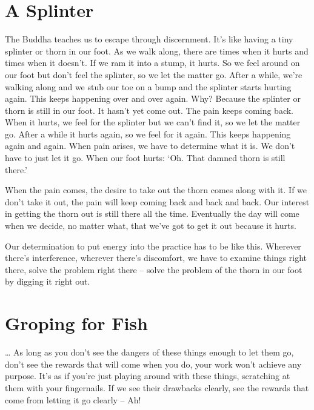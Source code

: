\clearpage

\section{A Splinter}

The Buddha teaches us to escape through discernment. It's like having a tiny splinter or thorn in our foot. As we walk along, there are times when it hurts and times when it doesn't. If we ram it into a stump, it hurts. So we feel around on our foot but don't feel the splinter, so we let the matter go. After a while, we're walking along and we stub our toe on a bump and the splinter starts hurting again. This keeps happening over and over again. Why? Because the splinter or thorn is still in our foot. It hasn't yet come out. The pain keeps coming back. When it hurts, we feel for the splinter but we can't find it, so we let the matter go. After a while it hurts again, so we feel for it again. This keeps happening again and again. When pain arises, we have to determine what it is. We don't have to just let it go. When our foot hurts: `Oh. That damned thorn is still there.'

When the pain comes, the desire to take out the thorn comes along with it. If we don't take it out, the pain will keep coming back and back and back. Our interest in getting the thorn out is still there all the time. Eventually the day will come when we decide, no matter what, that we've got to get it out because it hurts. 

Our determination to put energy into the practice has to be like this. Wherever there's interference, wherever there's discomfort, we have to examine things right there, solve the problem right there -- solve the problem of the thorn in our foot by digging it right out.

\clearpage

\section{Groping for Fish}

\ldots{} As long as you don't see the dangers of these things enough to let them go, don't see the rewards that will come when you do, your work won't achieve any purpose. It's as if you're just playing around with these things, scratching at them with your fingernails. If we see their drawbacks clearly, see the rewards that come from letting it go clearly -- Ah! 


